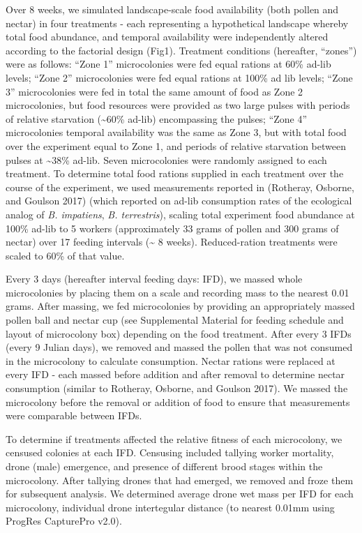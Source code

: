 \documentclass[11pt,]{article}
\begin{document}
Over 8 weeks, we simulated landscape-scale food availability (both
pollen and nectar) in four treatments - each representing a hypothetical
landscape whereby total food abundance, and temporal availability were
independently altered according to the factorial design (Fig1).
Treatment conditions (hereafter, ``zones'') were as follows: ``Zone 1''
microcolonies were fed equal rations at 60\% ad-lib levels; ``Zone 2''
microcolonies were fed equal rations at 100\% ad lib levels; ``Zone 3''
microcolonies were fed in total the same amount of food as Zone 2
microcolonies, but food resources were provided as two large pulses with
periods of relative starvation (\textasciitilde{}60\% ad-lib)
encompassing the pulses; ``Zone 4'' microcolonies temporal availability
was the same as Zone 3, but with total food over the experiment equal to
Zone 1, and periods of relative starvation between pulses at
\textasciitilde{}38\% ad-lib. Seven microcolonies were randomly assigned
to each treatment. To determine total food rations supplied in each
treatment over the course of the experiment, we used measurements
reported in (Rotheray, Osborne, and Goulson 2017) (which reported on
ad-lib consumption rates of the ecological analog of \emph{B.
impatiens}, \emph{B. terrestris}), scaling total experiment food
abundance at 100\% ad-lib to 5 workers (approximately 33 grams of pollen
and 300 grams of nectar) over 17 feeding intervals (\textasciitilde{} 8
weeks). Reduced-ration treatments were scaled to 60\% of that value.

Every 3 days (hereafter interval feeding days: IFD), we massed whole
microcolonies by placing them on a scale and recording mass to the
nearest 0.01 grams. After massing, we fed microcolonies by providing an
appropriately massed pollen ball and nectar cup (see Supplemental
Material for feeding schedule and layout of microcolony box) depending
on the food treatment. After every 3 IFDs (every 9 Julian days), we
removed and massed the pollen that was not consumed in the microcolony
to calculate consumption. Nectar rations were replaced at every IFD -
each massed before addition and after removal to determine nectar
consumption (similar to Rotheray, Osborne, and Goulson 2017). We massed
the microcolony before the removal or addition of food to ensure that
measurements were comparable between IFDs.

To determine if treatments affected the relative fitness of each
microcolony, we censused colonies at each IFD. Censusing included
tallying worker mortality, drone (male) emergence, and presence of
different brood stages within the microcolony. After tallying drones
that had emerged, we removed and froze them for subsequent analysis. We
determined average drone wet mass per IFD for each microcolony,
individual drone intertegular distance (to nearest 0.01mm using ProgRes
CapturePro v2.0).
\end{document}
